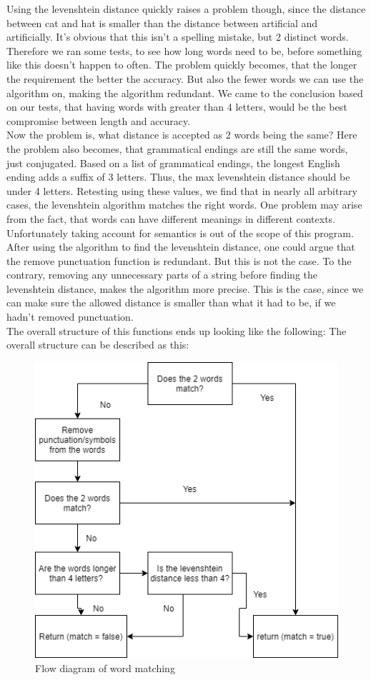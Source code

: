 Using the levenshtein distance quickly raises a problem though, since the distance between cat and hat is smaller than the distance
between artificial and artificially. 
It's obvious that this isn't a spelling mistake, but 2 distinct words. Therefore we ran
some tests, to see how long words need to be, before something like this doesn't happen to often. 
The problem quickly becomes, that the longer the requirement the better the accuracy. 
But also the fewer words we can use the algorithm on, making the algorithm redundant.
We came to the conclusion based on our tests, that having words with greater than 4 letters, would be
the best compromise between length and accuracy.
\\
Now the problem is, what distance is accepted as 2 words being the same?
Here the problem also becomes, that grammatical endings are still the same words, just conjugated.
Based on a list of grammatical endings, the longest English ending adds a suffix of 3 letters\cite{grammar_endings}. Thus,
the max levenshtein distance should be under 4 letters.
Retesting using these values, we find that in nearly all arbitrary cases, the levenshtein algorithm matches the right words.
One problem may arise from the fact, that words can have different meanings in different contexts. Unfortunately taking account for semantics is out of the scope of this program.
\\
After using the algorithm to find the levenshtein distance, one could argue that the remove punctuation function is redundant. But this is not the case. To the contrary, removing any
unnecessary parts of a string before finding the levenshtein distance, makes the algorithm more precise. This is the case, since we can make sure the allowed distance
is smaller than what it had to be, if we hadn't removed punctuation.
\\
The overall structure of this functions ends up looking like the following: %
\newpage
The overall structure can be described as this:
\begin{figure}[H]
  \centering
  \includegraphics[scale = 0.55]{figures/is_match}
  \caption{Flow diagram of word matching}\label{fig:is_match}
\end{figure}

